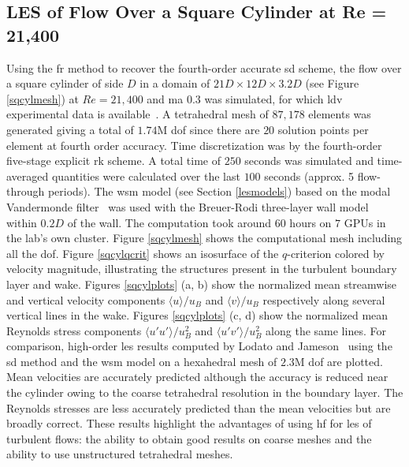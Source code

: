 \graphicspath{{\aiaadir /figures_squarecylinder/}}%

\subsection{LES of Flow Over a Square Cylinder at Re = 21,400}\label{sqcyl}

Using the \gls{fr} method to recover the fourth-order accurate \gls{sd} scheme, the flow over a square cylinder of side $D$ in a domain of $21D \times 12D \times 3.2D$ (see Figure \ref{sqcylmesh}) at $Re = 21,400$ and \gls{ma} $0.3$ was simulated, for which \gls{ldv} experimental data is available~\cite{lyn1994,lyn1995}.
A tetrahedral mesh of $87,178$ elements was generated giving a total of $1.74$M \gls{dof} since there are $20$ solution points per element at fourth order accuracy.
Time discretization was by the fourth-order five-stage explicit \gls{rk} scheme.
A total time of $250$ seconds was simulated and time-averaged quantities were calculated over the last $100$ seconds (approx. 5 flow-through periods).
The \gls{wsm} model (see Section \ref{lesmodels}) based on the modal Vandermonde filter~\cite{bull2014a} was used with the Breuer-Rodi three-layer wall model~\cite{breuer1994} within $0.2D$ of the wall.
The computation took around $60$ hours on $7$ GPUs in the lab's own cluster.
Figure \ref{sqcylmesh} shows the computational mesh including all the \gls{dof}.
Figure \ref{sqcylqcrit} shows an isosurface of the $q$-criterion colored by velocity magnitude, illustrating the structures present in the turbulent boundary layer and wake.
Figures \ref{sqcylplots} (a, b) show the normalized mean streamwise and vertical velocity components $\langle u \rangle/u_B$ and $\langle v \rangle/u_B$ respectively along several vertical lines in the wake.
Figures \ref{sqcylplots} (c, d) show the normalized mean Reynolds stress components $\langle u'u' \rangle/u_B^2$ and $\langle u'v' \rangle/u_B^2$ along the same lines.
For comparison, high-order \gls{les} results computed by Lodato and Jameson~\cite{lodato2012b} using the \gls{sd} method and the \gls{wsm} model on a hexahedral mesh of $2.3$M \gls{dof} are plotted.
Mean velocities are accurately predicted although the accuracy is reduced near the cylinder owing to the coarse tetrahedral resolution in the boundary layer.
The Reynolds stresses are less accurately predicted than the mean velocities but are broadly correct.
These results highlight the advantages of using \gls{hf} for \gls{les} of turbulent flows: the ability to obtain good results on coarse meshes and the ability to use unstructured tetrahedral meshes.


